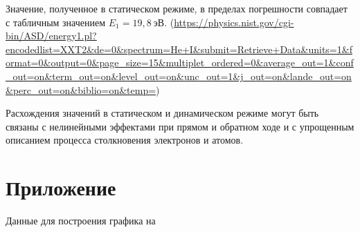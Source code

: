 \documentclass[a4paper, 12pt]{article}
\begin{document}
Значение, полученное в статическом режиме, в пределах погрешности
совпадает с табличным значением $E_1 = 19,8\
\text{эВ}$. (\url{https://physics.nist.gov/cgi-bin/ASD/energy1.pl?encodedlist=XXT2&de=0&spectrum=He+I&submit=Retrieve+Data&units=1&format=0&output=0&page_size=15&multiplet_ordered=0&average_out=1&conf_out=on&term_out=on&level_out=on&unc_out=1&j_out=on&lande_out=on&perc_out=on&biblio=on&temp=})

Расхождения значений в статическом и динамическом режиме могут быть
связаны с нелинейными эффектами при прямом и обратном ходе и с
упрощенным описанием процесса столкновения электронов и атомов.


\setcounter{section}{0}
\renewcommand{\thesection}{\Asbuk{section}}

\section{Приложение}
Данные для построения графика на 
\end{document}

